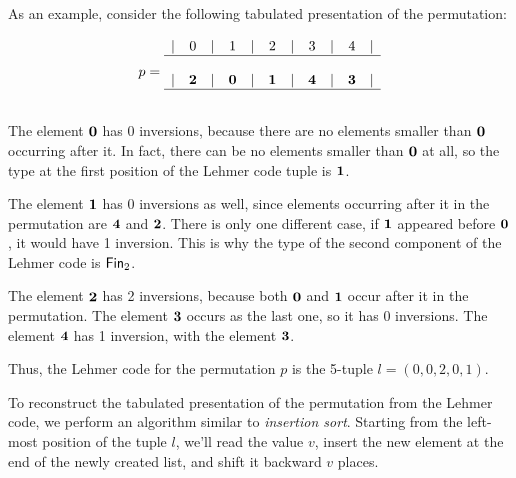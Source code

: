 As an example, consider the following tabulated presentation of the permutation:


\[
  p =
  \begin{array}{ccccccccccccccc}
    | & 0      & | & 1      & | & 2      & | & 3      & | & 4      & | \\
    \hline                                                             \\
    | & \mathbf{2} & | & \mathbf{0} & | & \mathbf{1} & | & \mathbf{4} & | & \mathbf{3} & | \\
    \hline                                                             \\
  \end{array}
\]


The element $\mathbf{0}$ has 0 inversions, because there are no elements smaller
than $\mathbf{0}$ occurring after it. In fact, there can be no elements smaller than
$\mathbf{0}$ at all, so the type at the first position of the Lehmer code tuple is
${\mathbf{1}}$.

The element $\mathbf{1}$ has 0 inversions as well, since elements occurring after it
in the permutation are $\mathbf{4}$ and $\mathbf{2}$. There is only one different case,
if $\mathbf{1}$ appeared before $\mathbf{0}$, it would have 1 inversion. This is why the
type of the second component of the Lehmer code is $\Fin[2]$.

The element $\mathbf{2}$ has 2 inversions, because both $\mathbf{0}$ and $\mathbf{1}$ occur
after it in the permutation. The element $\mathbf{3}$ occurs as the last one, so it
has 0 inversions. The element $\mathbf{4}$ has 1 inversion, with the element
$\mathbf{3}$.

Thus, the Lehmer code for the permutation $p$ is the 5-tuple
$l = (0, 0, 2, 0, 1)$.

To reconstruct the tabulated presentation of the permutation from the Lehmer
code, we perform an algorithm similar to \emph{insertion sort}. Starting from
the left-most position of the tuple $l$, we'll read the value $v$, insert the
new element at the end of the newly created list, and shift it backward $v$
places.

